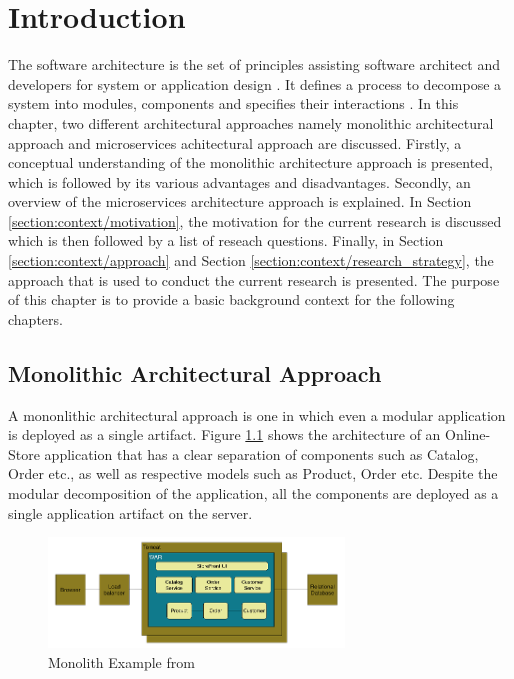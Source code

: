 \chapter{Introduction}\label{chapter:introduction}
The software architecture is the set of principles assisting software architect and developers for system or application design \cite{Dashofy:2009aa}. It defines a process to decompose a system into modules, components and specifies their interactions \cite{Brown:2015aa}. In this chapter, two different architectural approaches namely monolithic architectural approach and microservices achitectural approach are discussed. Firstly, a conceptual understanding of the monolithic architecture approach is presented, which is followed by its various advantages and disadvantages. Secondly, an overview of the microservices architecture approach is explained. In Section \ref{section:context/motivation}, the motivation for the current research is discussed which is then followed by a list of reseach questions. Finally, in Section \ref{section:context/approach} and Section \ref{section:context/research_strategy}, the approach that is used to conduct the current research is presented. The purpose of this chapter is to provide a basic background context for the following chapters.

\section{Monolithic Architectural Approach}\label{section:context/monolith}
A mononlithic architectural approach is one in which even a modular application is deployed as a single artifact. Figure \ref{fig:context/monolith-example} shows the architecture of an Online-Store application that has a clear separation of components such as Catalog, Order etc., as well as respective models such as Product, Order etc. Despite the modular decomposition of the application, all the components are deployed as a single application artifact on the server.\cite{Richardson:2014aa}\cite{Richardson:2014ab}

\begin{figure}[h!]
\begin{center}
\includegraphics[width=0.7\textwidth]{figures/context-monolith-example}
\caption{Monolith Example from \cite{Richardson:2014aa}}
\label{fig:context/monolith-example}
\end{center}
\end{figure}


